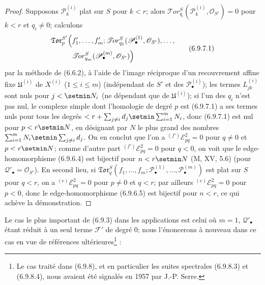 \begin{proof}
Supposons $\mathscr P_k^{(i)}$ plat sur $S$ pour $k<r$; alors
$\mathscr{T}\!or_{q_i}^S(\mathscr P_k^{(i)},\mathscr O_{S'})=0$ pour $k<r$
et $q_i\ne0$; calculons
\[
\begin{split}
  \mathfrak{Tor}_p^{S'}\Bigl(
  &f'_1,\ldots,f'_m;
  \mathscr{T}\!or_{q_1}^S(\mathscr P_\bullet^{(1)},\mathscr O_{S'}),
  \ldots,\\
  &\mathscr{T}\!or_{q_m}^S(\mathscr P_\bullet^{(m)},\mathscr O_{S'})
  \Bigr)
\end{split}
\tag{6.9.7.1}\label{III.6.9.7.1.fr}
\]
par la méthode de (6.6.2), à l'aide de l'image réciproque d'un recouvrement
affine fixe $\mathfrak U^{(i)}$ de $X^{(i)}$ ($1\leq i\leq m$)
(indépendant de $S'$ et des $\mathscr P_\bullet^{(i)}$); les termes
$L_{jk}^{(i)}$ sont nuls pour $j<\setmin N_i$ (ne dépendant que de
$\mathfrak U^{(i)}$); si l'un des $q_i$ n'est pas nul, le complexe simple dont
l'homologie de degré $p$ est (6.9.7.1) a ses termes nuls pour tous les degrés
$<r+\sum_{j\ne i}d_j\setmin\sum_{i=1}^m N_i$,
donc (6.9.7.1) est nul pour $p<r\setmin N$, en désignant par $N$ le plus grand des
nombres
$\sum_{i=1}^m N_i\setmin\sum_{j\ne i}d_j$.
On en conclut que l'on a ${}^{(f')}\mathscr E_{pq}^2=0$ pour $q\ne0$ et
$p<r\setmin N$; comme d'autre part ${}^{(f')}\mathscr E_{pq}^2=0$ pour $q<0$, on
voit que le edge-homomorphisme (6.9.6.4) est bijectif pour $n<r\setmin N$
(M, XV, 5.6) (pour $\mathscr Q'_\bullet=\mathscr O_{S'}$). En second lieu, si
$\mathfrak{Tor}_q^S
(f_1,\ldots,f_m;
\mathscr P_\bullet^{(1)},\ldots,\mathscr P_\bullet^{(m)})$
est plat sur $S$ pour $q<r$, on a ${}^{(e)}\mathscr E_{pq}^2=0$ pour $p\ne0$
et $q<r$; par ailleurs ${}^{(e)}\mathscr E_{pq}^2=0$ pour $p<0$, donc le
edge-homomorphisme (6.9.6.5) est bijectif pour $n<r$, ce qui achève la
démonstration.
\end{proof}

Le cas le plus important de (6.9.3) dans les applications est celui où $m=1$,
$\mathscr Q'_\bullet$ étant réduit à un seul terme $\mathscr F'$ de degré
$0$; nous l'énoncerons à nouveau dans ce cas en vue de références
ultérieures\footnote{Le cas traité dans (6.9.8), et en particulier les suites
spectrales (6.9.8.3) et (6.9.8.4), nous avaient été signalés en 1957 par
J.-P. Serre.} :

